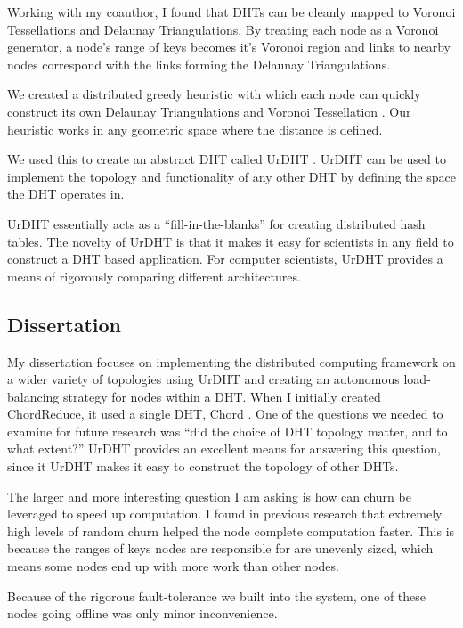 \documentclass[letterpaper]{article}
\begin{document}
Working with my coauthor, I found that DHTs can be cleanly mapped to Voronoi Tessellations and Delaunay Triangulations.
By treating each node as a Voronoi generator, a node's range of keys becomes it's Voronoi region
and links to nearby nodes correspond with the links forming the Delaunay Triangulations.

We created a distributed greedy heuristic with which each node can quickly construct its own Delaunay Triangulations and  Voronoi Tessellation \cite{dgvh}.
Our heuristic works in any geometric space where the distance is defined.

We used this to create an abstract DHT called UrDHT \cite{urdht}.
UrDHT can be used to implement the topology and functionality  of any other DHT by defining the space the DHT operates in.

UrDHT essentially acts as a ``fill-in-the-blanks'' for creating  distributed hash tables.
The novelty of UrDHT is that it makes it easy for scientists in any field to construct a DHT based application.
For computer scientists, UrDHT provides a means of rigorously comparing different architectures.



\subsection{Dissertation}
My dissertation focuses on implementing the distributed computing framework on a wider variety of topologies using UrDHT and creating an autonomous load-balancing strategy for nodes within a DHT.
When I initially created ChordReduce, it used a single DHT, Chord \cite{chord}.
One of the questions we needed to examine for future research was ``did the choice of DHT topology matter, and to what extent?''
UrDHT provides an excellent means for answering this question, since it UrDHT makes it easy to construct the topology of other DHTs.

The larger and more interesting question I am asking is how can churn be leveraged to speed up computation.
I found in previous research that extremely high levels of random churn helped the node complete computation faster.
This is because the ranges of keys nodes are responsible for are unevenly sized, which means some nodes end up with more work than other nodes.

Because of the rigorous fault-tolerance we built into the system, one of these nodes going offline was only minor inconvenience.
\end{document}
